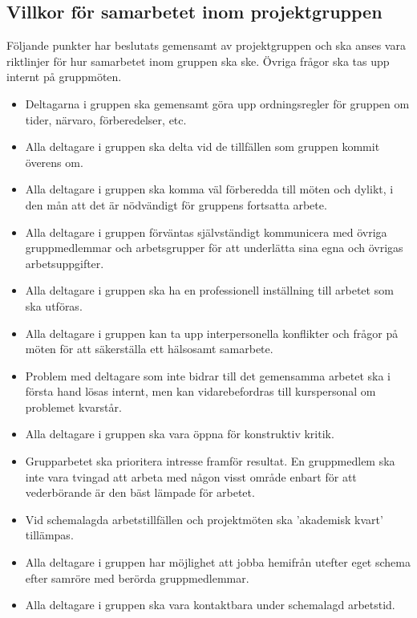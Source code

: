 \documentclass[a4paper,11pt]{article}
\begin{document}
\subsection{Villkor för samarbetet inom projektgruppen}
Följande punkter har beslutats gemensamt av projektgruppen och ska anses vara riktlinjer för hur samarbetet inom gruppen ska ske. Övriga frågor ska tas upp internt på gruppmöten.

\begin{itemize}
	\item Deltagarna i gruppen ska gemensamt göra upp ordningsregler för gruppen om tider, närvaro, förberedelser, etc.
	\item Alla deltagare i gruppen ska delta vid de tillfällen som gruppen kommit överens om.
	\item Alla deltagare i gruppen ska komma väl förberedda till möten och dylikt, i den mån att det är nödvändigt för gruppens fortsatta arbete.
	\item Alla deltagare i gruppen förväntas självständigt kommunicera med övriga gruppmedlemmar och arbetsgrupper för att underlätta sina egna och övrigas arbetsuppgifter.
	\item Alla deltagare i gruppen ska ha en professionell inställning till arbetet som ska utföras.
	\item Alla deltagare i gruppen kan ta upp interpersonella konflikter och frågor på möten för att säkerställa ett hälsosamt samarbete.
	\item Problem med deltagare som inte bidrar till det gemensamma arbetet ska i första hand lösas internt, men kan vidarebefordras till kurspersonal om problemet kvarstår.
	\item Alla deltagare i gruppen ska vara öppna för konstruktiv kritik.
	\item Grupparbetet ska prioritera intresse framför resultat. En gruppmedlem ska inte vara tvingad att arbeta med någon visst område enbart för att vederbörande är den bäst lämpade för arbetet.
	\item Vid schemalagda arbetstillfällen och projektmöten ska 'akademisk kvart' tillämpas.
	\item Alla deltagare i gruppen har möjlighet att jobba hemifrån utefter eget schema efter samröre med berörda gruppmedlemmar.
	\item Alla deltagare i gruppen ska vara kontaktbara under schemalagd arbetstid.
\end{itemize}
\end{document}
